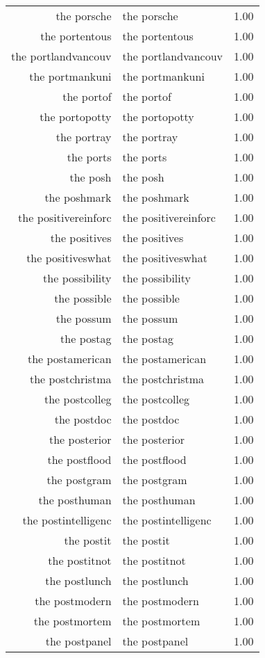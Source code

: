 \begin{table}[ht]
\begin{tabular}{rlr}
  the porsche & the porsche & 1.00 \\ 
  the portentous & the portentous & 1.00 \\ 
  the portlandvancouv & the portlandvancouv & 1.00 \\ 
  the portmankuni & the portmankuni & 1.00 \\ 
  the portof & the portof & 1.00 \\ 
  the portopotty & the portopotty & 1.00 \\ 
  the portray & the portray & 1.00 \\ 
  the ports & the ports & 1.00 \\ 
  the posh & the posh & 1.00 \\ 
  the poshmark & the poshmark & 1.00 \\ 
  the positivereinforc & the positivereinforc & 1.00 \\ 
  the positives & the positives & 1.00 \\ 
  the positiveswhat & the positiveswhat & 1.00 \\ 
  the possibility & the possibility & 1.00 \\ 
  the possible & the possible & 1.00 \\ 
  the possum & the possum & 1.00 \\ 
  the postag & the postag & 1.00 \\ 
  the postamerican & the postamerican & 1.00 \\ 
  the postchristma & the postchristma & 1.00 \\ 
  the postcolleg & the postcolleg & 1.00 \\ 
  the postdoc & the postdoc & 1.00 \\ 
  the posterior & the posterior & 1.00 \\ 
  the postflood & the postflood & 1.00 \\ 
  the postgram & the postgram & 1.00 \\ 
  the posthuman & the posthuman & 1.00 \\ 
  the postintelligenc & the postintelligenc & 1.00 \\ 
  the postit & the postit & 1.00 \\ 
  the postitnot & the postitnot & 1.00 \\ 
  the postlunch & the postlunch & 1.00 \\ 
  the postmodern & the postmodern & 1.00 \\ 
  the postmortem & the postmortem & 1.00 \\ 
  the postpanel & the postpanel & 1.00 \\ 

\end{tabular}
\end{table}

